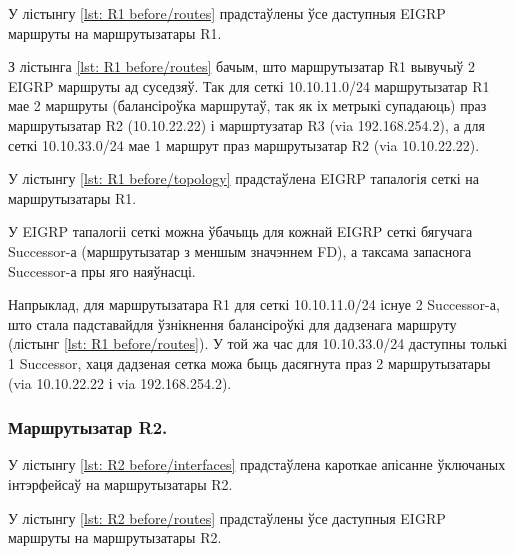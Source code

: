 У лістынгу \ref{lst: R1 before/routes} прадстаўлены ўсе даступныя EIGRP маршруты на маршрутызатары R1.




З лістынга \ref{lst: R1 before/routes} бачым, што маршрутызатар R1
вывучыў 2 EIGRP маршруты ад суседзяў.
Так для сеткі 10.10.11.0/24 маршрутызатар R1 мае 2 маршруты (балансіроўка
маршрутаў, так як іх метрыкі супадаюць)
праз маршрутызатар R2 (10.10.22.22) і маршртузатар R3 (via 192.168.254.2),
а для сеткі 10.10.33.0/24 мае 1 маршрут праз маршрутызатар R2 (via 10.10.22.22).

У лістынгу \ref{lst: R1 before/topology} прадстаўлена EIGRP тапалогія сеткі на
маршрутызатары R1.



У EIGRP тапалогіі сеткі можна ўбачыць для кожнай EIGRP сеткі бягучага
Successor-а (маршрутызатар з меншым значэннем FD), а таксама запаснога
Successor-а пры яго наяўнасці.

Напрыклад, для маршрутызатара R1 для сеткі 10.10.11.0/24 існуе 2 Successor-а,
што стала падставайдля ўзнікнення балансіроўкі для дадзенага маршруту
(лістынг \ref{lst: R1 before/routes}).
У той жа час для 10.10.33.0/24 даступны толькі 1 Successor, хаця дадзеная
сетка можа быць дасягнута праз 2 маршрутызатары (via 10.10.22.22 і via 192.168.254.2).


\subsubsection{Маршрутызатар R2.}

У лістынгу \ref{lst: R2 before/interfaces} прадстаўлена кароткае апісанне ўключаных інтэрфейсаў на маршрутызатары R2.



У лістынгу \ref{lst: R2 before/routes} прадстаўлены ўсе даступныя EIGRP маршруты на маршрутызатары R2.




